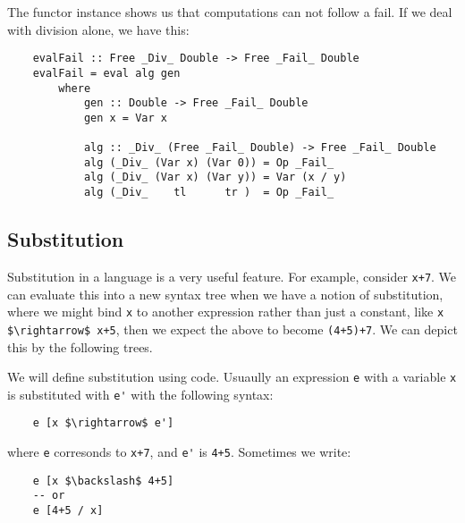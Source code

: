 \documentclass[a4paper,12pt]{article}
\theoremstyle{remark}
\begin{document}
The functor instance shows us that computations can not follow a fail. If we deal
with division alone, we have this:

\begin{lstlisting}
    evalFail :: Free _Div_ Double -> Free _Fail_ Double
    evalFail = eval alg gen
        where
            gen :: Double -> Free _Fail_ Double
            gen x = Var x

            alg :: _Div_ (Free _Fail_ Double) -> Free _Fail_ Double
            alg (_Div_ (Var x) (Var 0)) = Op _Fail_
            alg (_Div_ (Var x) (Var y)) = Var (x / y)
            alg (_Div_    tl      tr )  = Op _Fail_  \end{lstlisting}

\subsection{Substitution}

Substitution in a language is a very useful feature. For example, consider \lstinline{x+7}. We can
evaluate this into a new syntax tree when we have a notion of substitution, where we might bind
\lstinline{x} to another expression rather than just a constant, like \lstinline{x $\rightarrow$ x+5},
then we expect the above to become \lstinline{(4+5)+7}. We can depict this by the following trees.

\begin{figure}[H]
\centering
\begin{subfigure}{.5\textwidth}
  \centering
\end{subfigure}%
\begin{subfigure}{.5\textwidth}
  \centering

\end{subfigure}
\end{figure}

We will define substitution using code. Usuaully an expression \lstinline{e} with a variable \lstinline{x}
is substituted with \lstinline{e'} with the following syntax:

\begin{lstlisting}
    e [x $\rightarrow$ e']  \end{lstlisting}

where \lstinline{e} corresonds to \lstinline{x+7}, and \lstinline{e'} is \lstinline{4+5}. Sometimes we write:

\begin{lstlisting}
    e [x $\backslash$ 4+5]
    -- or
    e [4+5 / x]  \end{lstlisting}
\end{document}
